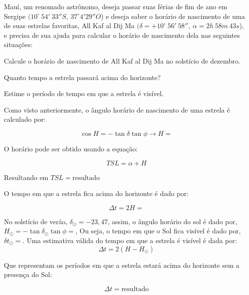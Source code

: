 \documentclass[11pt]{article}
\begin{document}
\begin{pproblem}
    Mauí, um renomado astrônomo, deseja passar suas férias de fim de ano em Sergipe \((10^\circ \ 54'\ 33'' S, \ 37^\circ 4'29'' O\)) e deseja saber o horário de nascimento de uma de suas estrelas favoritas, All Kaf al Dij Ma  \((\delta = +10^\circ \ 56'\ 58'', \ \alpha = 2h \ 58m \ 43s\)), e precisa de sua ajuda para calcular o horário de nascimento dela nas seguintes situações:
    
    \begin{alternativas}
        \item Calcule o horário de nascimento de All Kaf al Dij Ma  no solstício de dezembro.
        \item Quanto tempo a estrela passará acima do horizonte?
        \item Estime o período de tempo em que a estrela é visível.
    \end{alternativas}

\begin{pssolution*}{}{ }
    \begin{alternativas}
        \item Como visto anteriormente, o ângulo horário de nascimento de uma estrela é calculado por: 

        \[\cos H = - \tan \delta \tan \phi \rightarrow H = \]

        O horário pode ser obtido usando a equação: 

        \[TSL = \alpha + H\]

        Resultando em \(\boxed{TSL = \text{resultado}}\)

        \item O tempo em que a estrela fica acima do horizonte é dado por: 
        
        \[\Delta t = 2 H = \]

        \item No solstício de verão, \(\delta_\odot = -23,47\), assim, o ângulo horário do sol é dado por, \(H_\odot = -\tan\delta_\odot \tan\phi = \), Ou seja, o tempo em que o Sol fica visível é dado por, \(\delta t_\odot = \). Uma estimativa válida do tempo em que a estrela é visível é dada por: 
        \[\Delta t = 2 (H - H_\odot)\]

        Que representam os períodos em que a estrela estará acima do horizonte sem a presença do Sol: 
       
        \[\boxed{\Delta t = \text{resultado}}\]
    \end{alternativas}
\end{pssolution*}
\end{pproblem}
\end{document}
